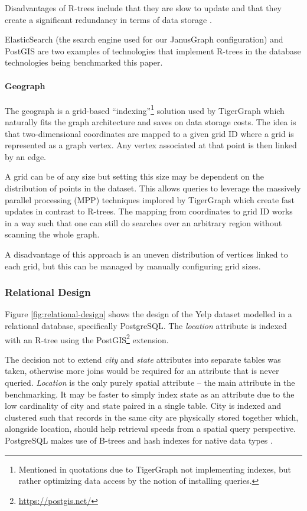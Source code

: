 Disadvantages of R-trees include that they are slow to update and that they create a significant redundancy in terms of data storage \cite{graphgurus}.

ElasticSearch (the search engine used for our JanusGraph configuration) and PostGIS are two examples of technologies that implement R-trees in the database technologies being benchmarked this paper.

\paragraph{Geograph}

The geograph is a grid-based ``indexing''\footnote{Mentioned in quotations due to TigerGraph not implementing indexes, but rather optimizing data access by the notion of installing queries.} solution used by TigerGraph which naturally fits the graph architecture and saves on data storage costs. The idea is that two-dimensional coordinates are mapped to a given grid ID where a grid is represented as a graph vertex. Any vertex associated at that point is then linked by an edge.

A grid can be of any size but setting this size may be dependent on the distribution of points in the dataset. This allows queries to leverage the massively parallel processing (MPP) techniques implored by TigerGraph which create fast updates in contrast to R-trees. The mapping from coordinates to grid ID works in a way such that one can still do searches over an arbitrary region without scanning the whole graph.

A disadvantage of this approach is an uneven distribution of vertices linked to each grid, but this can be managed by manually configuring grid sizes.

\subsubsection{Relational Design}
\label{subsub:relational-design}

Figure \ref{fig:relational-design} shows the design of the Yelp dataset modelled in a relational database, specifically PostgreSQL. The \emph{location} attribute is indexed with an R-tree using the PostGIS\footnote{\url{https://postgis.net/}} extension.

The decision not to extend \emph{city} and \emph{state} attributes into separate tables was taken, otherwise more joins would be required for an attribute that is never queried. \emph{Location} is the only purely spatial attribute -- the main attribute in the benchmarking. It may be faster to simply index state as an attribute due to the low cardinality of city and state paired in a single table. City is indexed and clustered such that records in the same city are physically stored together which, alongside location, should help retrieval speeds from a spatial query perspective. PostgreSQL makes use of B-trees and hash indexes for native data types \cite{post-vs-mysql}.

